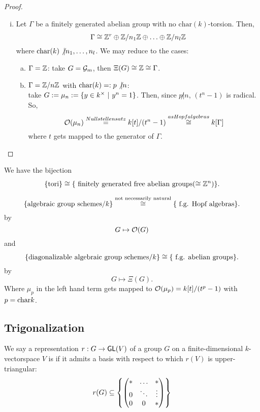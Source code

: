 \begin{proof}
\begin{enumerate}[(i)]
	\item Let $\Gamma$ be a finitely generated abelian group with no $\mathrm{char}(k)$-torsion. Then,
	\[\Gamma \overset{}{\cong} \mathbb{Z}^r \oplus \mathbb{Z}/n_1\mathbb{Z} \oplus \ldots \oplus \mathbb{Z}/n_l\mathbb{Z}\]
	where $\mathrm{char}(k) \not| n_1 , \ldots , n_l$. We may reduce to the cases:
	\begin{enumerate}[(a)]
		\item $\Gamma = \mathbb{Z}$: take $G = \mathcal{G}_m$, then $\Xi(G) \overset{}{\cong} \mathbb{Z} \overset{}{\cong} \Gamma$.
		\item $\Gamma = \mathbb{Z}/n\mathbb{Z}$ with $\mathrm{char}(k) =: p \not | n$:\\
		take $G:= \mu_n := \left\lbrace y \in k^\times ~ | ~ y^n = 1\right\rbrace$. Then, since $p\not| n$, $(t^n - 1)$ is radical.
		So, 
		\[ \mathcal{O}(\mu_n) \overset{Nullstellensatz}{=} k[t] /(t^n - 1) \overset{as Hopf algebras}{\cong} k[\Gamma] \]
		where $t$ gets mapped to the generator of $\Gamma$.
	\end{enumerate}
 \end{enumerate}
\end{proof}
\begin{corollary}
We have the bijection
\[
\{\text{tori}\}
\overset{}{\cong}
\{ \text{ finitely generated free abelian groups} (\overset{}{\cong} \mathbb{Z}^n) \}.
\]
\end{corollary}

\begin{remark}
\[
\{\text{algebraic group schemes} / k\}
\overset{\text{not necessarily natural}}{\cong}
\{ \text{ f.g. Hopf algebras} \}.
\]
by
\[ G \mapsto \mathcal{O}(G) \]
and
\[
\{\text{diagonalizable algebraic group schemes}/k\}
\overset{}{\cong}
\{ \text{ f.g. abelian groups} \}.
	\]
by
\[ G \mapsto \Xi(G). \]
Where $\mu_p$ in the left hand term gets mapped to $\mathcal{O}(\mu_p) = k[t] / (t^p - 1)$ with $p = \mathrm{char} k$.
\end{remark}


\subsection{Trigonalization}
We say a representation $r : G \overset{}{\rightarrow} \textsf{GL}(V)$ of a group $G$ on a finite-dimensional $k$-vectorspace $V$ is  if it admits a basis with respect to which $r(V)$ is upper-triangular:
\[ r(G) \subseteq \left\lbrace
\left(\begin{matrix} * & \ldots & *\\ 0 & \ddots & \vdots \\ 0 & 0 & * \end{matrix}\right)
\right\rbrace \]

